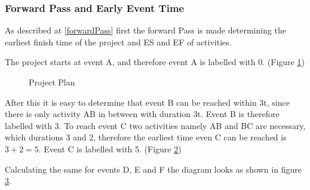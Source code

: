 \subsubsection{Forward Pass and Early Event Time}
As described at \ref{forwardPass} first the forward Pass is made determining the earliest finish time of the project and ES and EF of activities.

The project starts at event A, and therefore event A is labelled with 0. (Figure \ref{pic:plan2})
\begin{figure}[h] 
\centerline{}
\label{pic:plan2}
\caption{Project Plan}
\end{figure}
After this it is easy to determine that event B can be reached within 3t, since there is only activity AB in between with duration 3t. Event B is therefore labelled with 3.
To reach event C two activities namely AB and BC are necessary, which durations 3 and 2, therefore the earliest time even C can be reached is $3+2 = 5$. Event C is labelled with 5. (Figure \ref{pic:plan3})
\begin{figure}[h] 
\centerline{}
\label{pic:plan3}
\caption{}
\end{figure}

Calculating the same for events D, E and F the diagram looks as shown in figure \ref{pic:plan4}.
\begin{figure}[h] 
\centerline{}
\label{pic:plan4}
\caption{}
\end{figure}

